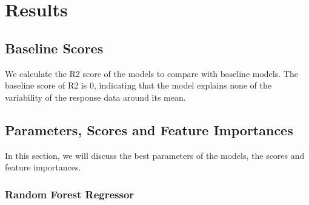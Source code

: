 \documentclass{article}
\begin{document}
\newpage
\section{Results}
\subsection{Baseline Scores}
We calculate the R2 score of the models to compare with baseline models. The baseline score of R2 is 0, indicating that the model explains none of the variability of the response data around its mean.
\subsection{Parameters, Scores and Feature Importances}
In this section, we will discuss the best parameters of the models, the scores and feature importances.
\subsubsection{Random Forest Regressor}
\end{document}
